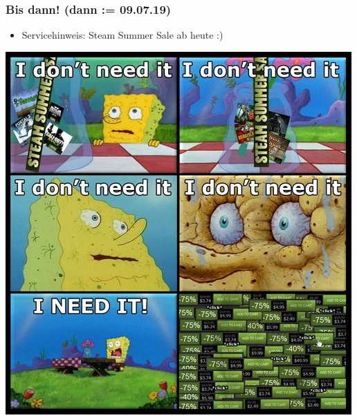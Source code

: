 \documentclass[18pt]{beamer}
\begin{document}
	\begin{frame}
		\frametitle{Bis dann! (dann  := 09.07.19)}
		\begin{itemize}
			\item Servicehinweis: Steam Summer Sale ab heute :)
		\end{itemize}
		\centering
		\includegraphics[scale=0.4]{./pics/tut4/steam.jpg}
	\end{frame}
\end{document}
